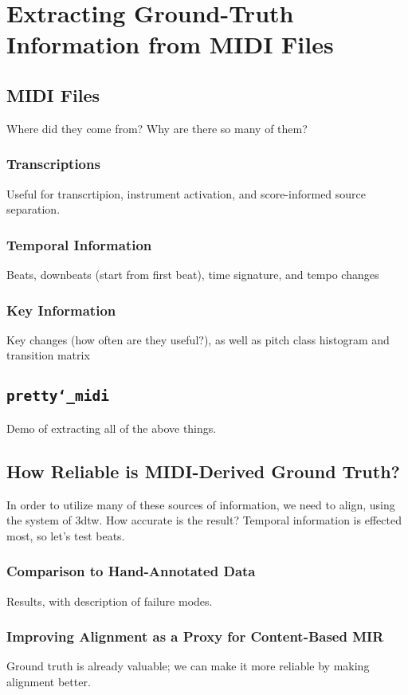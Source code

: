 \chapter{Extracting Ground-Truth Information from MIDI Files}

\section{MIDI Files}

Where did they come from?
Why are there so many of them?

\subsection{Transcriptions}

Useful for transcrtipion, instrument activation, and score-informed source separation.

\subsection{Temporal Information}

Beats, downbeats (start from first beat), time signature, and tempo changes

\subsection{Key Information}

Key changes (how often are they useful?), as well as pitch class histogram and transition matrix

\section{\texttt{pretty\char`_midi}}

Demo of extracting all of the above things.

\section{How Reliable is MIDI-Derived Ground Truth?}

In order to utilize many of these sources of information, we need to align, using the system of 3dtw.
How accurate is the result?
Temporal information is effected most, so let's test beats.

\subsection{Comparison to Hand-Annotated Data}

Results, with description of failure modes.

\subsection{Improving Alignment as a Proxy for Content-Based MIR}

Ground truth is already valuable; we can make it more reliable by making alignment better.

